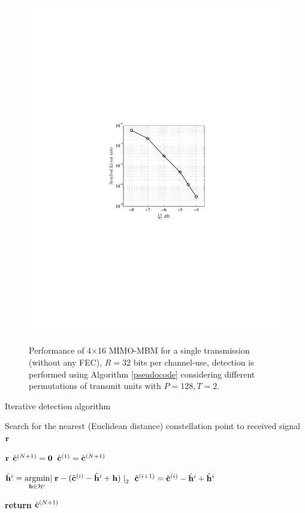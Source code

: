 \begin{figure}[t]
\centering
\hspace{-1cm}
\vspace{0cm}

{\includegraphics[height = 9 cm, width = 12cm, trim = 6cm 9.6cm 6cm 10cm ]{./fig/algorithm_performance}}
\caption{Performance of 4$\times$16 MIMO-MBM for a single transmission (without any FEC), $R = 32$ bits per channel-use, detection is performed using Algorithm \ref{pseudocode} considering different permutations of transmit units with $ P = 128, T =2$.}
\label{algorithmPerformance}
\end{figure}

\begin{algorithm}[t]
\caption{Iterative detection algorithm}\label{pseudocode}
 Search for the nearest (Euclidean distance) constellation point to received signal $\mathbf{r}$ 
\begin{algorithmic}[1]
 {$\mathbf{r}$}
\State $\hat{\mathbf{c} } ^ {(N+1)} = \mathbf{0}$
 
\State $\hat{\mathbf{c} } ^ {(1)} = \hat{\mathbf{c} } ^ {(N+1)}$
 

\State $\tilde{\mathbf{h}}^{i} = \underset{\mathbf{h} \in  \mathcal{H}^{i}}{\text{argmin}} {\mid \mathbf{r} - (\hat{\mathbf{c} } ^ {(i)} - \hat{\mathbf{h}}^{i}+ \mathbf{h})\mid} _ 2$
\State $\hat{\mathbf{c} } ^ {(i+1)} = \hat{\mathbf{c} } ^ {(i)}- \hat{\mathbf{h}}^{i}+ \tilde{\mathbf{h}}^{i}$

\EndFor\label{tend}
\EndFor
\State \textbf{return}  $\hat{\mathbf{c} } ^ {(N+1)}$
\EndFunction

\end{algorithmic}
\end{algorithm}

